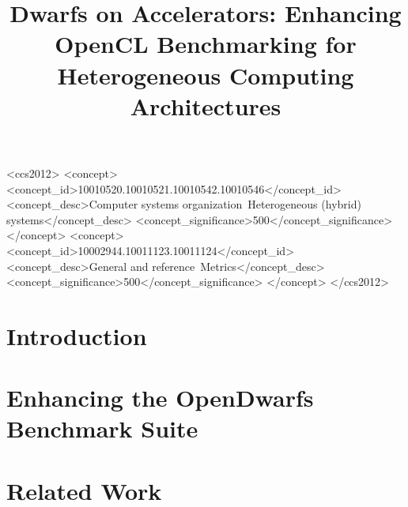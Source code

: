 \documentclass[sigconf,preprint,9pt]{acmart}
\begin{document}
\title[Dwarfs on Accelerators]{Dwarfs on Accelerators: Enhancing OpenCL Benchmarking for Heterogeneous Computing Architectures}

%

\begin{abstract}
	
\end{abstract}

\begin{CCSXML}
	<ccs2012>
	<concept>
	<concept_id>10010520.10010521.10010542.10010546</concept_id>
	<concept_desc>Computer systems organization~Heterogeneous (hybrid) systems</concept_desc>
	<concept_significance>500</concept_significance>
	</concept>
	<concept>
	<concept_id>10002944.10011123.10011124</concept_id>
	<concept_desc>General and reference~Metrics</concept_desc>
	<concept_significance>500</concept_significance>
	</concept>
	</ccs2012>
\end{CCSXML}

\maketitle

\section{Introduction}
\section{Enhancing the OpenDwarfs Benchmark Suite}

\section{Related Work}
\end{document}
